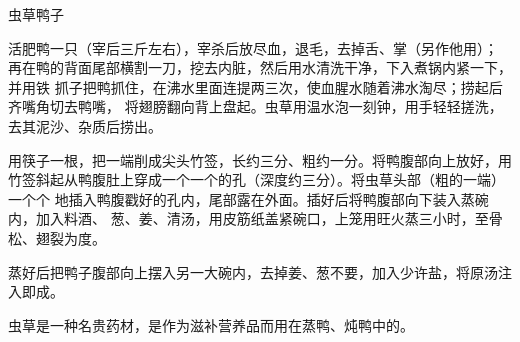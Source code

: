 \begin{recipe}{虫草鸭子}

\ingredients


\preparation

\step 活肥鸭一只（宰后三斤左右），宰杀后放尽血，退毛，去掉舌、掌（另作他用）；
再在鸭的背面尾部横割一刀，挖去内脏，然后用水清洗干净，下入煮锅内紧一下，并用铁
抓子把鸭抓住，在沸水里面连提两三次，使血腥水随着沸水淘尽；捞起后齐嘴角切去鸭嘴，
将翅膀翻向背上盘起。虫草用温水泡一刻钟，用手轻轻搓洗，去其泥沙、杂质后捞出。

\step 用筷子一根，把一端削成尖头竹签，长约三分、粗约一分。将鸭腹部向上放好，用
竹签斜起从鸭腹肚上穿成一个一个的孔（深度约三分）。将虫草头部（粗的一端）一个个
地插入鸭腹戳好的孔内，尾部露在外面。插好后将鸭腹部向下装入蒸碗内，加入料酒、
葱、姜、清汤，用皮筋纸盖紧碗口，上笼用旺火蒸三小时，至骨松、翅裂为度。

\step 蒸好后把鸭子腹部向上摆入另一大碗内，去掉姜、葱不要，加入少许盐，将原汤注
入即成。

\features

虫草是一种名贵药材，是作为滋补营养品而用在蒸鸭、炖鸭中的。

\end{recipe}

